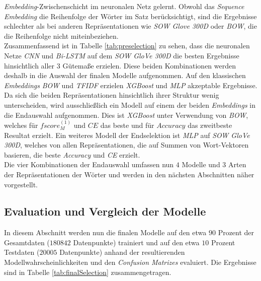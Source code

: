 \documentclass[a4paper,11pt]{article}
\begin{document}
\textit{Embedding}-Zwischenschicht im neuronalen Netz gelernt. Obwohl das \textit{Sequence} \textit{Embedding} die Reihenfolge der Wörter im Satz berücksichtigt, sind die Ergebnisse schlechter als bei anderen Repräsentationen wie \textit{SOW Glove 300D} oder \textit{BOW}, die die Reihenfolge nicht miteinbeziehen.\\

Zusammenfassend ist in Tabelle \ref{tab:preselection} zu sehen, dass die neuronalen Netze \textit{CNN} und \textit{Bi-LSTM} auf dem \textit{SOW GloVe 300D} die besten Ergebnisse hinsichtlich aller $3$ Gütemaße erzielen. Diese beiden Kombinationen werden deshalb in die Auswahl der finalen Modelle aufgenommen. Auf den klassischen \textit{Embeddings} \textit{BOW} und \textit{TFIDF} erzielen \textit{XGBoost} und \textit{MLP} akzeptable Ergebnisse. Da sich die beiden Repräsentationen hinsichtlich ihrer Struktur wenig unterscheiden, wird ausschließlich ein Modell auf einem der beiden \textit{Embeddings} in die Endauswahl aufgenommen. Dies ist \textit{XGBoost} unter Verwendung von \textit{BOW}, welches für $fscore_M^{(1)}$ und $CE$ das beste und für $Accuracy$ das zweitbeste Resultat erzielt. Ein weiteres Modell der Endselektion ist \textit{MLP} auf \textit{SOW GloVe 300D}, welches von allen Repräsentationen, die auf Summen von Wort-Vektoren basieren, die beste \textit{Accuracy} und \textit{CE} erzielt. \\

Die vier Kombinationen der Endauswahl umfassen nun $4$ Modelle und $3$ Arten der Repräsentationen der Wörter und werden in den nächsten Abschnitten näher vorgestellt.





\subsection{Evaluation und Vergleich der Modelle} \label{kap:evalFinal}

In diesem Abschnitt werden nun die finalen Modelle auf den etwa $90$ Prozent der Gesamtdaten ($180842$ Datenpunkte) trainiert und auf den etwa $10$ Prozent Testdaten ($20005$ Datenpunkte) anhand der resultierenden Modellwahrscheinlichkeiten und den \textit{Confusion Matrizes} evaluiert. Die Ergebnisse sind in Tabelle \ref{tab:finalSelection} zusammengetragen. 
\end{document}
